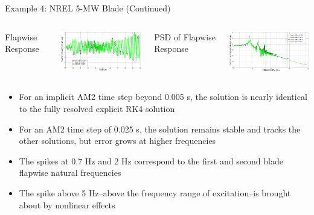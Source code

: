 \documentclass[dvips,xcolor=cmyk]{beamer}
\begin{document}
\begin{frame}{Example 4: NREL 5-MW Blade (Continued)}
\begin{itemize}
   \begin{columns}[c]
   \column{2.0 in}
    \pause
    \item Flapwise Response
     \begin{center}
     \includegraphics[width=2.2in]{EPSF/u_5MW_flap_final.eps}
     \end{center}
     
     \column{2.0 in}
    \pause
    \item PSD of Flapwise Response
    \begin{center}
     \includegraphics[width=2.2in]{EPSF/u_5MW_flap_psd_final.eps}
     \end{center}
     
     \end{columns}
     \begin{itemize}
        \pause
        \item For an implicit AM2 time step beyond 0.005 s, the solution is nearly identical to the fully resolved explicit RK4 solution
        \pause
        \item For an AM2 time step of 0.025 s, the solution remains stable and tracks the other solutions, but error grows at higher frequencies
        \pause
        \item The spikes at 0.7 Hz and 2 Hz correspond to the first and second blade flapwise natural frequencies
        \pause
        \item The spike above 5 Hz--above the frequency range of excitation--is brought about by nonlinear effects
     \end{itemize} 
\end{itemize}
\end{frame}
\end{document}
